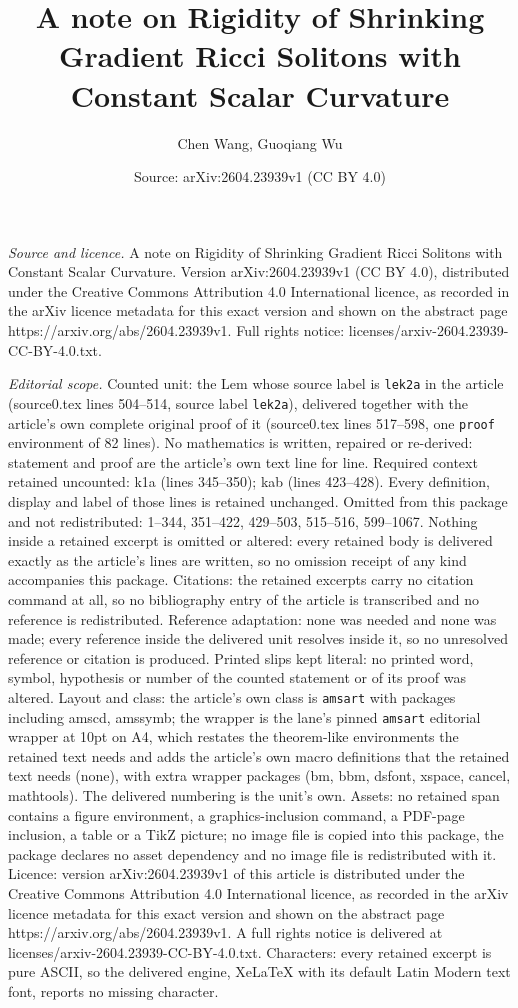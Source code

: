 \documentclass[10pt,a4paper]{amsart}
\title[A note on Rigidity of Shrinking Gradient Ricci Solitons with]{A note on Rigidity of Shrinking Gradient Ricci Solitons with Constant Scalar Curvature}
\author{Chen Wang, Guoqiang Wu}
\date{Source: arXiv:2604.23939v1 (CC BY 4.0)}
\begin{document}
\maketitle

\noindent\emph{Source and licence.} A note on Rigidity of Shrinking Gradient Ricci Solitons with Constant Scalar Curvature. Version arXiv:2604.23939v1 (CC BY 4.0), distributed under the Creative Commons Attribution 4.0 International licence, as recorded in the arXiv licence metadata for this exact version and shown on the abstract page https://arxiv.org/abs/2604.23939v1. Full rights notice: licenses/arxiv-2604.23939-CC-BY-4.0.txt.\par\smallskip

\noindent\textit{Editorial scope.} Counted unit: the Lem whose source label is \texttt{lek2a} in the article (source0.tex lines 504--514, source label \texttt{lek2a}), delivered together with the article's own complete original proof of it (source0.tex lines 517--598, one \texttt{proof} environment of 82 lines). No mathematics is written, repaired or re-derived: statement and proof are the article's own text line for line. Required context retained uncounted: k1a (lines 345--350); kab (lines 423--428). Every definition, display and label of those lines is retained unchanged. Omitted from this package and not redistributed: 1--344, 351--422, 429--503, 515--516, 599--1067. Nothing inside a retained excerpt is omitted or altered: every retained body is delivered exactly as the article's lines are written, so no omission receipt of any kind accompanies this package. Citations: the retained excerpts carry no citation command at all, so no bibliography entry of the article is transcribed and no reference is redistributed. Reference adaptation: none was needed and none was made; every reference inside the delivered unit resolves inside it, so no unresolved reference or citation is produced. Printed slips kept literal: no printed word, symbol, hypothesis or number of the counted statement or of its proof was altered. Layout and class: the article's own class is \texttt{amsart} with packages including amscd, amssymb; the wrapper is the lane's pinned \texttt{amsart} editorial wrapper at 10pt on A4, which restates the theorem-like environments the retained text needs and adds the article's own macro definitions that the retained text needs (none), with extra wrapper packages (bm, bbm, dsfont, xspace, cancel, mathtools). The delivered numbering is the unit's own. Assets: no retained span contains a figure environment, a graphics-inclusion command, a PDF-page inclusion, a table or a TikZ picture; no image file is copied into this package, the package declares no asset dependency and no image file is redistributed with it. Licence: version arXiv:2604.23939v1 of this article is distributed under the Creative Commons Attribution 4.0 International licence, as recorded in the arXiv licence metadata for this exact version and shown on the abstract page https://arxiv.org/abs/2604.23939v1. A full rights notice is delivered at licenses/arxiv-2604.23939-CC-BY-4.0.txt. Characters: every retained excerpt is pure ASCII, so the delivered engine, XeLaTeX with its default Latin Modern text font, reports no missing character.
\end{document}
